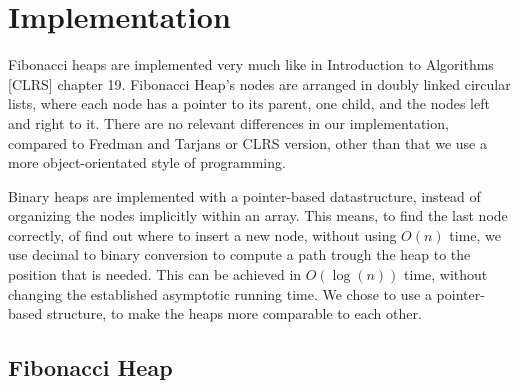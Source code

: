 \documentclass[a4paper,10pt]{article}
\begin{document}
\section{Implementation}
Fibonacci heaps are implemented very much like in Introduction to Algorithms [CLRS] chapter 19. Fibonacci Heap's nodes are arranged in doubly linked circular lists, where each node has a pointer to its parent, one child, and the nodes left and right to it. There are no relevant differences in our implementation, compared to Fredman and Tarjans or CLRS version, other than that we use a more object-orientated style of programming.

Binary heaps are implemented with a pointer-based datastructure, instead of organizing the nodes implicitly within an array. This means, to find the last node correctly, of find out where to insert a new node, without using $O(n)$ time, we use decimal to binary conversion to compute a path trough the heap to the position that is needed. This can be achieved in $O(\log(n))$ time, without changing the established asymptotic running time. We chose to use a pointer-based structure, to make the heaps more comparable to each other.%

\subsection{Fibonacci Heap}
\end{document}
